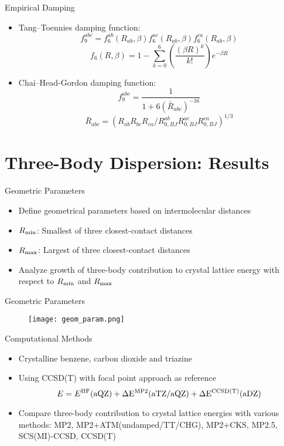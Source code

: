 \documentclass{beamer}
\begin{document}
    \begin{frame}{Empirical Damping}
        \begin{itemize}
            \item Tang--Toennies damping function:
            $$f^{abc}_9 = f^{ab}_6(R_{ab}, \beta) f^{ac}_6(R_{ab}, \beta) f^{ca}_6(R_{ab}, \beta)$$
            $$f_6(R, \beta) = 1 - \sum_{k=0}^{6} \left( \frac{\left(\beta R\right)^k}{k!} \right) e^{-\beta R}$$
            \item Chai--Head-Gordon damping function:
            $$f^{abc}_9 = \frac{1}{1 + 6 \left(\bar{R}_{abc}\right)^{-16}}$$
            $$\bar{R}_{abc} = \left(R_{ab} R_{bc} R_{ca} / R^{ab}_{0,BJ} R^{ac}_{0,BJ} R^{ca}_{0,BJ} \right)^{1/3}$$
        \end{itemize}
    \end{frame}


\section{Three-Body Dispersion: Results}

    \begin{frame}{Geometric Parameters}
        \begin{itemize}
            \item Define geometrical parameters based on intermolecular distances
            \item $R_{\rm{min}}$: Smallest of three closest-contact distances
            \item $R_{\rm{max}}$: Largest of three closest-contact distances
            \item Analyze growth of three-body contribution to crystal lattice energy with respect to $R_{\rm{min}}$ and $R_{\rm{max}}$
        \end{itemize}
    \end{frame}

    \begin{frame}{Geometric Parameters}
        \begin{figure}
            \centering
            \texttt{[image: geom\_param.png]}
        \end{figure}
    \end{frame}

    \begin{frame}{Computational Methods}
        \begin{itemize}
            \item Crystalline benzene, carbon dioxide and triazine
            \item Using CCSD(T) with focal point approach as reference
            $$E = E^{\rm{HF}}(\rm{aQZ}) + \Delta E^{\rm{MP2}}(\rm{aTZ/aQZ}) + \Delta E^{\rm{CCSD(T)}}(\rm{aDZ}) $$
            \item Compare three-body contribution to crystal lattice energies with various methods: MP2, MP2+ATM(undamped/TT/CHG), MP2+CKS, MP2.5, SCS(MI)-CCSD, CCSD(T)
        \end{itemize}
    \end{frame}
\end{document}
